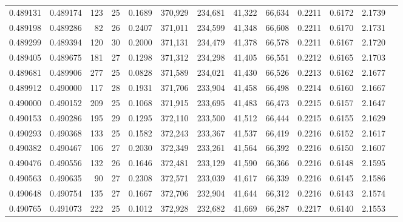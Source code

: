 \begin{tabular}{rrrrrrrrrrrrr}
0.489131 & 0.489174 &    123 &    25 &                                     0.1689 & 370,929 & 234,681 &  41,322 &  66,634 & 0.2211 & 0.6172 & 2.1739 \\
0.489198 & 0.489286 &     82 &    26 &                                     0.2407 & 371,011 & 234,599 &  41,348 &  66,608 & 0.2211 & 0.6170 & 2.1731 \\
0.489299 & 0.489394 &    120 &    30 &                                     0.2000 & 371,131 & 234,479 &  41,378 &  66,578 & 0.2211 & 0.6167 & 2.1720 \\
0.489405 & 0.489675 &    181 &    27 &                                     0.1298 & 371,312 & 234,298 &  41,405 &  66,551 & 0.2212 & 0.6165 & 2.1703 \\
0.489681 & 0.489906 &    277 &    25 &                                     0.0828 & 371,589 & 234,021 &  41,430 &  66,526 & 0.2213 & 0.6162 & 2.1677 \\
0.489912 & 0.490000 &    117 &    28 &                                     0.1931 & 371,706 & 233,904 &  41,458 &  66,498 & 0.2214 & 0.6160 & 2.1667 \\
0.490000 & 0.490152 &    209 &    25 &                                     0.1068 & 371,915 & 233,695 &  41,483 &  66,473 & 0.2215 & 0.6157 & 2.1647 \\
0.490153 & 0.490286 &    195 &    29 &                                     0.1295 & 372,110 & 233,500 &  41,512 &  66,444 & 0.2215 & 0.6155 & 2.1629 \\
0.490293 & 0.490368 &    133 &    25 &                                     0.1582 & 372,243 & 233,367 &  41,537 &  66,419 & 0.2216 & 0.6152 & 2.1617 \\
0.490382 & 0.490467 &    106 &    27 &                                     0.2030 & 372,349 & 233,261 &  41,564 &  66,392 & 0.2216 & 0.6150 & 2.1607 \\
0.490476 & 0.490556 &    132 &    26 &                                     0.1646 & 372,481 & 233,129 &  41,590 &  66,366 & 0.2216 & 0.6148 & 2.1595 \\
0.490563 & 0.490635 &     90 &    27 &                                     0.2308 & 372,571 & 233,039 &  41,617 &  66,339 & 0.2216 & 0.6145 & 2.1586 \\
0.490648 & 0.490754 &    135 &    27 &                                     0.1667 & 372,706 & 232,904 &  41,644 &  66,312 & 0.2216 & 0.6143 & 2.1574 \\
0.490765 & 0.491073 &    222 &    25 &                                     0.1012 & 372,928 & 232,682 &  41,669 &  66,287 & 0.2217 & 0.6140 & 2.1553 \\

\end{tabular}
